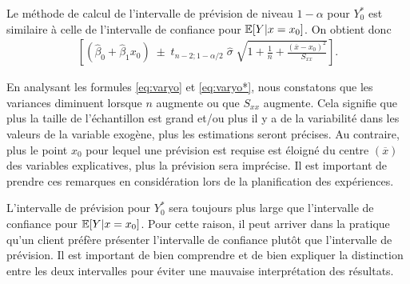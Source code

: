 Le méthode de calcul de l'intervalle de prévision de niveau $1-\alpha$ pour ${Y}_0^*$ est similaire à celle de l'intervalle de confiance pour  $\mathbb{E}[Y|x=x_0]$. On obtient donc
\begin{eqnarray}
\left[(\hat{\beta}_0 + \hat{\beta}_1 x_0)\; \pm\; t_{n-2; 1-\alpha/2} \; \hat\sigma \; \sqrt{1+\frac{1}{n}+\frac{(\overline x-x_0)^2}{S_{xx}}} \right].
\label{eq:int_prev}
\end{eqnarray}


En analysant les formules \eqref{eq:varyo} et \eqref{eq:varyo*}, nous constatons que les variances diminuent lorsque $n$ augmente ou que $S_{xx}$ augmente. Cela signifie que plus la taille de l'échantillon est grand et/ou plus il y a de la variabilité dans les valeurs de la variable exogène, plus les estimations seront précises. Au contraire, plus le point $x_0$ pour lequel une prévision est requise est éloigné du centre $(\overline x)$ des variables explicatives, plus la prévision sera imprécise.
Il est important de prendre ces remarques en considération lors de la planification des expériences.


\begin{remarque}
L'intervalle de prévision pour $Y_0^*$ sera toujours plus large que l'intervalle de confiance pour $\mathbb{E}[Y|x=x_0]$. Pour cette raison, il peut arriver dans la pratique qu'un client préfère présenter l'intervalle de confiance plutôt que l'intervalle de prévision. Il est important de bien comprendre et de bien expliquer la distinction entre les deux intervalles pour éviter une mauvaise interprétation des résultats.
\end{remarque}



